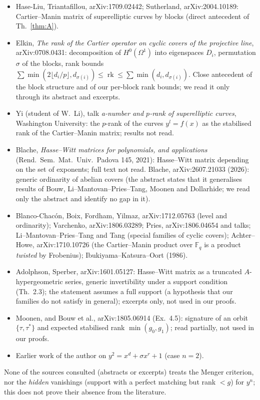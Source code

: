 \documentclass[11pt,a4paper]{article}
\newcommand{\F}{\mathbb{F}}
\begin{document}
\begin{itemize}
\item Hase-Liu, Triantafillou, arXiv:1709.02442; Sutherland, arXiv:2004.10189:
Cartier--Manin matrix of superelliptic curves by blocks (direct antecedent of
Th.~\ref{thm:A}).
\item Elkin, \emph{The rank of the Cartier operator on cyclic covers of the
projective line}, arXiv:0708.0431: decomposition of $H^0(\Omega^1)$ into
eigenspaces $D_i$, permutation $\sigma$ of the blocks, rank bounds
$\sum\min(2\lfloor d_i/p\rfloor,d_{\sigma(i)})\le\operatorname{rk}\le
\sum\min(d_i,d_{\sigma(i)})$. Close antecedent of the block structure and of our
per-block rank bounds; we read it only through its abstract and excerpts.
\item Yi (student of W.~Li), talk \emph{a-number and $p$-rank of superelliptic
curves}, Washington University: the $p$-rank of the curves $y^l=f(x)$ as the
stabilised rank of the Cartier--Manin matrix; results not read.
\item Blache, \emph{Hasse--Witt matrices for polynomials, and applications}
(Rend.\ Sem.\ Mat.\ Univ.\ Padova 145, 2021): Hasse--Witt matrix depending on the
set of exponents; full text not read. Blache, arXiv:2607.21033 (2026): generic
ordinarity of abelian covers (the abstract states that it generalises results of
Bouw, Li--Mantovan--Pries--Tang, Moonen and Dollarhide; we read only the abstract and
identify no gap in it).
\item Blanco-Chac\'on, Boix, Fordham, Yilmaz, arXiv:1712.05763 (level and
ordinarity); Varchenko, arXiv:1806.03289; Pries, arXiv:1806.04654 and talks;
Li--Mantovan--Pries--Tang and Tang (special families of cyclic covers);
Achter--Howe, arXiv:1710.10726 (the Cartier--Manin product over $\F_q$ is a
product \emph{twisted} by Frobenius); Ibukiyama--Katsura--Oort (1986).
\item Adolphson, Sperber, arXiv:1601.05127: Hasse--Witt matrix as a truncated
$A$-hypergeometric series, generic invertibility under a support condition
(Th.~2.3); the statement assumes a full support (a hypothesis that our families
do not satisfy in general); excerpts only, not used in our proofs.
\item Moonen, and Bouw et al., arXiv:1805.06914 (Ex.~4.5): signature of an orbit
$\{\tau,\tau^*\}$ and expected stabilised rank $\min(g_0,g_1)$; read partially,
not used in our proofs.
\item Earlier work of the author on $y^2=x^d+\sigma x^r+1$ (case $n=2$).
\end{itemize}
None of the sources consulted (abstracts or excerpts) treats the Menger
criterion, nor the \emph{hidden} vanishings (support with a perfect matching but
rank $<g$) for $y^n$; this does not prove their absence from the literature.
\end{document}
